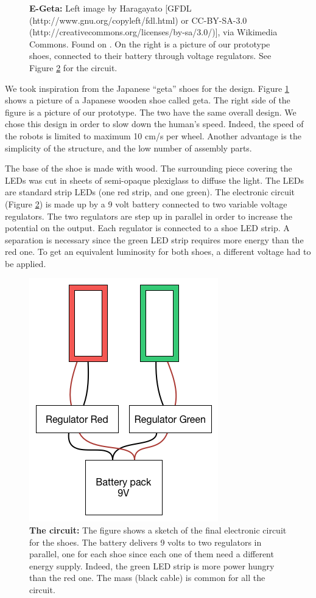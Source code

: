 \documentclass[oneside, a4paper, 12pt]{memoir}
\let\oldCaption\caption
\renewcommand{\caption}[2]{
\oldCaption[#1]{{\small\sffamily\bfseries #1:} #2}
}
\begin{document}
\begin{figure}[!htp]
		\caption{E-Geta}{Left image by Haragayato [GFDL (http://www.gnu.org/copyleft/fdl.html) or CC-BY-SA-3.0 (http://creativecommons.org/licenses/by-sa/3.0/)], via Wikimedia Commons. Found on \citet{wiki:001}. On the right is a picture of our prototype shoes, connected to their battery through voltage regulators. See Figure \ref{fig:circuit} for the circuit.}
		\label{fig:e-geta}
	\end{figure}
	
	We took inspiration from the Japanese \enquote{geta} shoes for the design. Figure \ref{fig:e-geta} shows a picture of a Japanese wooden shoe called geta. The right side of the figure is a picture of our prototype. The two have the same overall design. We chose this design in order to slow down the human's speed. Indeed, the speed of the robots is limited to maximum 10 cm/s per wheel. Another advantage is the simplicity of the structure, and the low number of assembly parts.
	
	The base of the shoe is made with wood. The surrounding piece covering the LEDs was cut in sheets of semi-opaque plexiglass to diffuse the light. The LEDs are standard strip LEDs (one red strip, and one green). The electronic circuit (Figure \ref{fig:circuit}) is made up by a 9 volt battery connected to two variable voltage regulators. The two regulators are step up in parallel in order to increase the potential on the output. Each regulator is connected to a shoe LED strip. A separation is necessary since the green LED strip requires more energy than the red one. To get an equivalent luminosity for both shoes, a different voltage had to be applied.
	
	\begin{figure}[!htp]\centering
		\includegraphics[scale=0.5]{figures/circuit.png}
		\caption{The circuit}{The figure shows a sketch of the final electronic circuit for the shoes. The battery delivers 9 volts to two regulators in parallel, one for each shoe since each one of them need a different energy supply. Indeed, the green LED strip is more power hungry than the red one. The mass (black cable) is common for all the circuit.}
		\label{fig:circuit}
	\end{figure}
	
\end{document}
